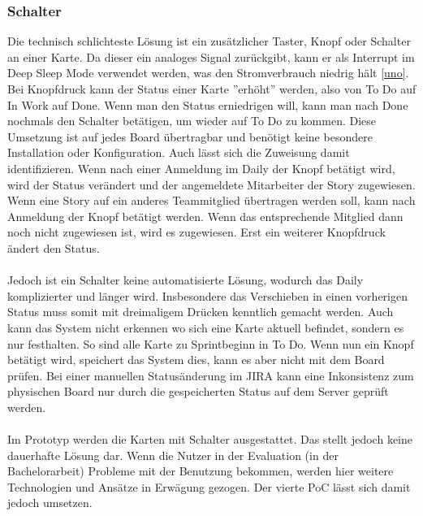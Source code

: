 \documentclass[12pt,titlepage]{scrartcl}
\begin{document}
			\subsubsection{Schalter}
			Die technisch schlichteste Lösung ist ein zusätzlicher Taster, Knopf oder Schalter an einer Karte. Da dieser ein analoges Signal zurückgibt, kann er als Interrupt im Deep Sleep Mode verwendet werden, was den Stromverbrauch niedrig hält \ref{uno}. Bei Knopfdruck kann der Status einer Karte ''erhöht'' werden, also von To Do auf In Work auf Done.  Wenn man den Status erniedrigen will, kann man nach Done nochmals den Schalter betätigen, um wieder auf To Do zu kommen. Diese Umsetzung ist auf jedes Board übertragbar und benötigt keine besondere Installation oder Konfiguration. Auch lässt sich die Zuweisung damit identifizieren. Wenn nach einer Anmeldung im Daily der Knopf betätigt wird, wird der Status verändert und der angemeldete Mitarbeiter der Story zugewiesen. Wenn eine Story auf ein anderes Teammitglied übertragen werden soll, kann nach Anmeldung der Knopf betätigt werden. Wenn das entsprechende Mitglied dann noch nicht zugewiesen ist, wird es zugewiesen. Erst ein weiterer Knopfdruck ändert den Status. \\ \\
Jedoch ist ein Schalter keine automatisierte Lösung, wodurch das Daily komplizierter und länger wird. Insbesondere das Verschieben in einen vorherigen Status muss somit mit dreimaligem Drücken kenntlich gemacht werden. Auch kann das System nicht erkennen wo sich eine Karte aktuell befindet, sondern es nur festhalten. So sind alle Karte zu Sprintbeginn in To Do. Wenn nun ein Knopf betätigt wird, speichert das System dies, kann es aber nicht mit dem Board prüfen. Bei einer manuellen Statusänderung im JIRA kann eine Inkonsistenz zum physischen Board nur durch die gespeicherten Status auf dem Server geprüft werden. \\ \\
Im Prototyp werden die Karten mit Schalter ausgestattet. Das stellt jedoch keine dauerhafte Lösung dar. Wenn die Nutzer in der Evaluation (in der Bachelorarbeit) Probleme mit der Benutzung bekommen, werden hier weitere Technologien und Ansätze in Erwägung gezogen. Der vierte PoC lässt sich damit jedoch umsetzen.
\end{document}

